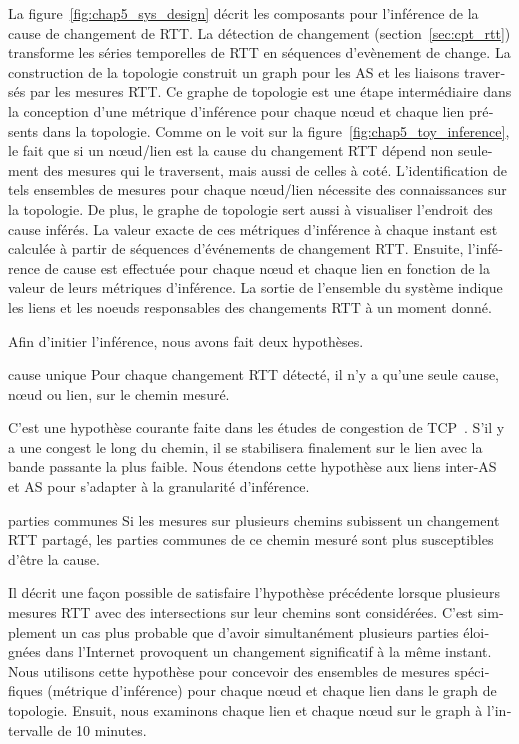 \begin{otherlanguage}{french}
La figure~\ref{fig:chap5_sys_design} décrit les composants pour l'inférence de la cause de changement de RTT. 
La détection de changement (section~\ref{sec:cpt_rtt}) transforme les séries temporelles de RTT en séquences d'evènement de change.
La construction de la topologie construit un graph pour les AS et les liaisons traversés par les mesures RTT.
Ce graphe de topologie est une étape intermédiaire dans la conception d'une métrique d'inférence 
pour chaque nœud et chaque lien présents dans la topologie. 
Comme on le voit sur la figure~\ref{fig:chap5_toy_inference}, le fait que si un nœud/lien est la cause du changement RTT
dépend non seulement des mesures qui le traversent, mais aussi de celles à coté. 
L'identification de tels ensembles de mesures pour chaque nœud/lien nécessite des connaissances sur la topologie. 
De plus, le graphe de topologie sert aussi à visualiser l'endroit des cause inférés.
La valeur exacte de ces métriques d'inférence à chaque instant est calculée à partir de séquences d'événements de changement RTT. 
Ensuite, l'inférence de cause est effectuée pour chaque nœud et chaque lien en fonction de la valeur de leurs métriques d'inférence.
La sortie de l'ensemble du système indique les liens et les noeuds responsables des changements RTT à un moment donné.

Afin d'initier l'inférence, nous avons fait deux hypothèses.
\begin{assumption}{1}{cause unique}
Pour chaque changement RTT détecté, il n'y a qu'une seule cause, nœud ou lien, sur le chemin mesuré.
\end{assumption}
C'est une hypothèse courante faite dans les études de congestion de TCP~\cite{mathis1997macroscopic, Cardwell2016}. 
S'il y a une congest le long du chemin, il se stabilisera finalement sur le lien avec la bande passante la plus faible.
Nous étendons cette hypothèse aux liens inter-AS et AS pour s'adapter à la granularité d'inférence.

\begin{assumption}{2}{parties communes}
Si les mesures sur plusieurs chemins subissent un changement RTT partagé, 
les parties communes de ce chemin mesuré sont plus susceptibles d'être la cause.
\end{assumption}
Il décrit une façon possible de satisfaire l'hypothèse précédente lorsque plusieurs mesures RTT avec des intersections sur leur chemins sont considérées.
C'est simplement un cas plus probable que d'avoir simultanément plusieurs parties éloignées dans l'Internet provoquent un changement significatif à la même instant. 
Nous utilisons cette hypothèse pour concevoir des ensembles de mesures spécifiques (métrique d'inférence) pour chaque nœud et chaque lien dans le graph de topologie.
Ensuit, nous examinons chaque lien et chaque nœud sur le graph à l'intervalle de 10 minutes.


\end{otherlanguage}
